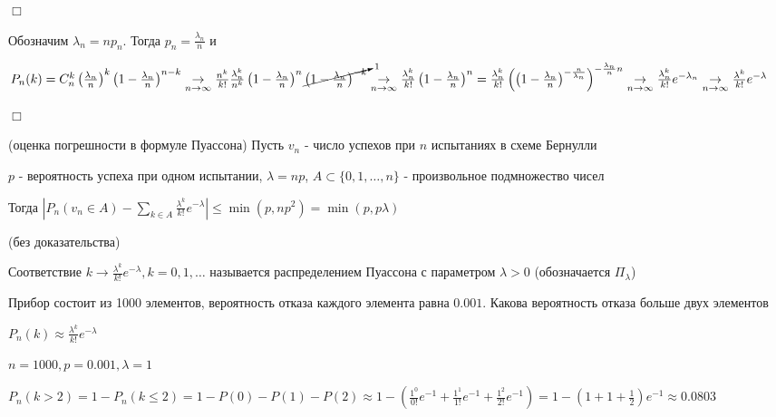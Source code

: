 \documentclass[12pt]{article}
\begin{document}
    \begin{MyProof}
        $\Box$

        Обозначим $\lambda_n = n p_n$. Тогда $p_n = \frac{\lambda_n}{n}$ и

        $P_n(k) = C^k_n \left(\frac{\lambda_n}{n}\right)^k \left(1 - \frac{\lambda_n}{n}\right)^{n - k} \underset{n \to \infty}{\rightarrow} 
        \frac{n^k}{k!} \frac{\lambda^k_n}{n^k} \left(1 - \frac{\lambda_n}{n}\right)^n \cancelto{1}{\left(1 - \frac{\lambda_n}{n}\right)^{-k}}
        \underset{n \to \infty}{\rightarrow} \frac{\lambda_n^k}{k!} \left(1 - \frac{\lambda_n}{n}\right)^n = \frac{\lambda_n^k}{k!} \left(\left(1 - \frac{\lambda_n}{n}\right)^{-\frac{n}{\lambda_n}}\right)^{-\frac{\lambda_n}{n}n} \underset{n \to \infty}{\rightarrow} \frac{\lambda_n^k}{k!} e^{-\lambda_n} \underset{n \to \infty}{\rightarrow} \frac{\lambda^k}{k!} e^{-\lambda}$

        $\Box$
    \end{MyProof}

    \hypertarget{errorinpoissonformula}{}

    \begin{MyTheorem}
         (оценка погрешности в формуле Пуассона) Пусть $v_n$ - число успехов при $n$ испытаниях в схеме Бернулли

        $p$ - вероятность успеха при одном испытании, $\lambda = np$, $A \subset \{0, 1, \dots, n\}$ - произвольное подмножество чисел

        Тогда $|P_n (v_n \in A) - \sum_{k \in A} \frac{\lambda^k}{k!} e^{-\lambda}| \leq \min (p, np^2) = \min (p, p\lambda)$

        (без доказательства)
    \end{MyTheorem}

    \Def Соответствие $k \to \frac{\lambda^k}{k!} e^{-\lambda}, k = 0, 1, \dots$ называется распределением Пуассона
    с параметром $\lambda > 0$ (обозначается $\Pi_\lambda$)

    \Ex Прибор состоит из 1000 элементов, вероятность отказа каждого элемента равна $0.001$. Какова вероятность отказа больше двух элементов

    $P_n(k) \approx \frac{\lambda^k}{k!} e^{-\lambda}$

    $n = 1000, p = 0.001, \lambda = 1$

    $P_n(k > 2) = 1 - P_n (k \leq 2) = 1 - P(0) - P(1) - P(2) \approx 1 - \left(\frac{1^0}{0!} e^{-1} + \frac{1^1}{1!} e^{-1} + \frac{1^2}{2!} e^{-1}\right) =
    1 - \left(1 + 1 + \frac{1}{2}\right) e^{-1} \approx 0.0803$
\end{document}
